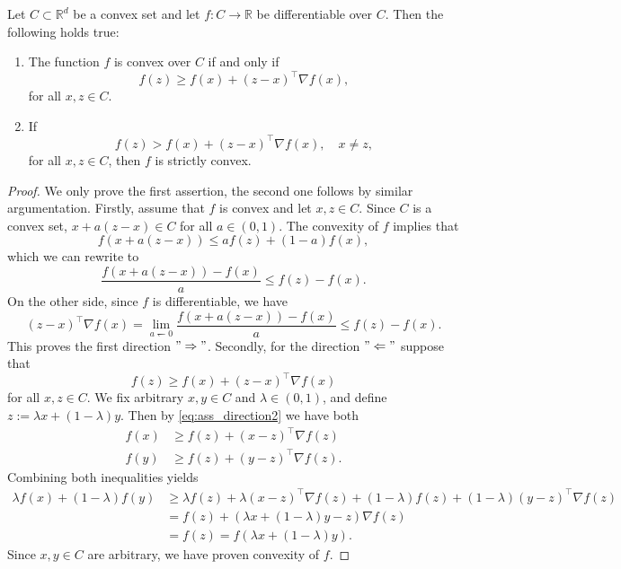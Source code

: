 \documentclass[12pt,openany]{book}
\theoremstyle{definition}
\theoremstyle{definition}
\newcommand{\R}{\mathbb{R}}
\begin{document}
\begin{prop}\label{prop:app_convexity1}
Let $C\subset \R^d$ be a convex set and let $f:C\to\R$ be differentiable over $C$. Then the following holds true:
\begin{enumerate}
\item The function $f$ is convex over $C$ if and only if 
\[f(z)\ge f(x) + (z-x)^\top \nabla f(x), \]
for all $x,z\in C$.
\item If 
\[f(z) > f(x) + (z-x)^\top \nabla f(x),\quad x\neq z, \] 
for all $x,z\in C$, then $f$ is strictly convex.
\end{enumerate} 
\end{prop}
\begin{proof}
We only prove the first assertion, the second one follows by similar argumentation. Firstly, assume that $f$ is convex and let $x,z\in C$. Since $C$ is a convex set, $x+a(z-x) \in C$ for all $a\in(0,1)$.  The convexity of $f$ implies that
\[f(x+a(z-x)) \le af(z) + (1-a) f(x),\]
which we can rewrite to
\[\frac{f(x+a(z-x))-f(x)}{a}\le f(z)-f(x). \]
On the other side, since $f$ is differentiable, we have
\[(z-x)^\top \nabla f(x)=\lim_{a\leftharpoondown 0} \frac{f(x+a(z-x))-f(x)}{a}\le f(z)-f(x). \]
This proves the first direction $"\Rightarrow"$.
Secondly, for the direction $"\Leftarrow"$ suppose that
\begin{equation}\label{eq:ass_direction2}
f(z)\ge f(x)+ (z-x)^\top \nabla f(x)
\end{equation}
for all $x,z\in C$.  We fix arbitrary $x,y\in C$ and $\lambda\in(0,1)$, and define $z:= \lambda x+ (1-\lambda)y$. Then by \eqref{eq:ass_direction2} we have both 
\begin{align*}
f(x)&\ge f(z) + (x-z)^\top \nabla f(z)\\
f(y)&\ge f(z) + (y-z)^\top \nabla f(z).
\end{align*}
Combining both inequalities yields
\begin{align*}
\lambda f(x) + (1-\lambda) f(y) &\ge \lambda f(z) + \lambda (x-z)^\top \nabla f(z) + (1-\lambda) f(z)+ (1-\lambda) (y-z)^\top \nabla f(z)\\
&=f(z)+ (\lambda x+(1-\lambda)y-z)\nabla f(z)\\ &= f(z) =f(\lambda x+(1-\lambda)y).
\end{align*}
Since $x,y\in C$ are arbitrary, we have proven convexity of $f$. 
\end{proof}
\end{document}
